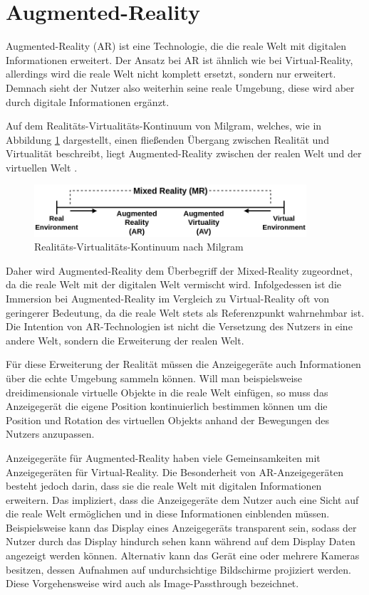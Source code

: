   \section{Augmented-Reality}
  Augmented-Reality (AR) ist eine Technologie, die die reale Welt mit digitalen Informationen erweitert.
  Der Ansatz bei AR ist ähnlich wie bei Virtual-Reality, allerdings wird die reale Welt nicht komplett ersetzt, sondern nur erweitert.
  Demnach sieht der Nutzer also weiterhin seine reale Umgebung, diese wird aber durch digitale Informationen ergänzt.

  \newpage

  Auf dem Realitäts-Virtualitäts-Kontinuum von Milgram, welches, wie in Abbildung \ref{fig:rv-continuum} dargestellt, einen fließenden Übergang zwischen Realität und Virtualität beschreibt, liegt Augmented-Reality zwischen der realen Welt und der virtuellen Welt \autocite[vgl.][S.9]{milgram1999}.

  \begin{figure}[H]
    \centering
    \includegraphics[width=0.9\textwidth]{images/RV-Continuum.png}
    \caption{Realitäts-Virtualitäts-Kontinuum nach Milgram}
    \label{fig:rv-continuum}
  \end{figure}

  Daher wird Augmented-Reality dem Überbegriff der Mixed-Reality zugeordnet, da die reale Welt mit der digitalen Welt vermischt wird.
  Infolgedessen ist die Immersion bei Augmented-Reality im Vergleich zu Virtual-Reality oft von geringerer Bedeutung, da die reale Welt stets als Referenzpunkt wahrnehmbar ist.
  Die Intention von AR-Technologien ist nicht die Versetzung des Nutzers in eine andere Welt, sondern die Erweiterung der realen Welt.

  Für diese Erweiterung der Realität müssen die Anzeigegeräte auch Informationen über die echte Umgebung sammeln können.
  Will man beispielsweise dreidimensionale virtuelle Objekte in die reale Welt einfügen, so muss das Anzeigegerät die eigene Position kontinuierlich bestimmen können um die Position und Rotation des virtuellen Objekts anhand der Bewegungen des Nutzers anzupassen.

  Anzeigegeräte für Augmented-Reality haben viele Gemeinsamkeiten mit Anzeigegeräten für Virtual-Reality.
  Die Besonderheit von AR-Anzeigegeräten besteht jedoch darin, dass sie die reale Welt mit digitalen Informationen erweitern.
  Das impliziert, dass die Anzeigegeräte dem Nutzer auch eine Sicht auf die reale Welt ermöglichen und in diese Informationen einblenden müssen.
  Beispielsweise kann das Display eines Anzeigegeräts transparent sein, sodass der Nutzer durch das Display hindurch sehen kann während auf dem Display Daten angezeigt werden können.
  Alternativ kann das Gerät eine oder mehrere Kameras besitzen, dessen Aufnahmen auf undurchsichtige Bildschirme projiziert werden.
  Diese Vorgehensweise wird auch als Image-Passthrough bezeichnet.

